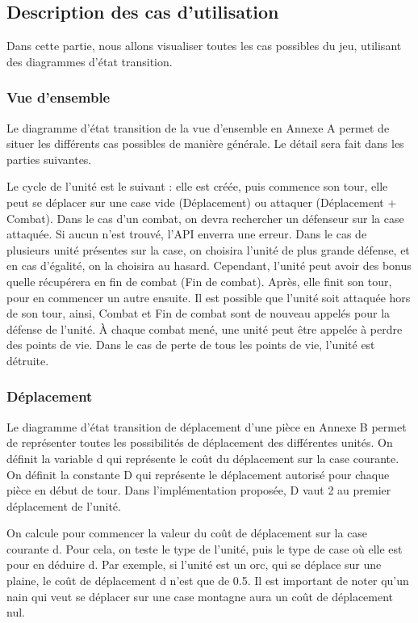 \subsection{Description des cas d'utilisation}
Dans cette partie, nous allons visualiser toutes les cas possibles du jeu, utilisant des diagrammes d'état transition.
\subsubsection{Vue d'ensemble}
Le diagramme d'état transition de la vue d'ensemble en Annexe A permet de situer les différents cas possibles de manière générale.  Le détail sera fait dans les parties suivantes.

Le cycle de l'unité est le suivant : elle est créée, puis commence son tour, elle peut se déplacer sur une case vide (Déplacement) ou attaquer (Déplacement + Combat). Dans le cas d'un combat, on devra rechercher un défenseur sur la case attaquée. Si aucun n'est trouvé, l'API enverra une erreur. Dans le cas de plusieurs unité présentes sur la case, on choisira l'unité de plus grande défense, et en cas d'égalité, on la choisira au hasard. Cependant, l'unité peut avoir des bonus quelle récupérera en fin de combat (Fin de combat). Après, elle finit son tour, pour en commencer un autre ensuite. Il est possible que l'unité soit attaquée hors de son tour, ainsi, Combat et Fin de combat sont de nouveau appelés pour la défense de l'unité. À chaque combat mené, une unité peut être appelée à perdre des points de vie. Dans le cas de perte de tous les points de vie, l'unité est détruite.

\subsubsection{Déplacement}
Le diagramme d'état transition de déplacement d'une pièce en Annexe B permet de représenter toutes les possibilités de déplacement des différentes unités. On définit la variable d qui représente le coût du déplacement sur la case courante. On définit la constante D qui représente le déplacement autorisé pour chaque pièce en début de tour. Dans l'implémentation proposée, D vaut 2 au premier déplacement de l'unité.

On calcule pour commencer la valeur du coût de déplacement sur la case courante d. Pour cela, on teste le type de l'unité, puis le type de case où elle est pour en déduire d. Par exemple, si l'unité est un orc, qui se déplace sur une plaine, le coût de déplacement d n'est que de 0.5. Il est important de noter qu'un nain qui veut se déplacer sur une case montagne aura un coût de déplacement nul.

